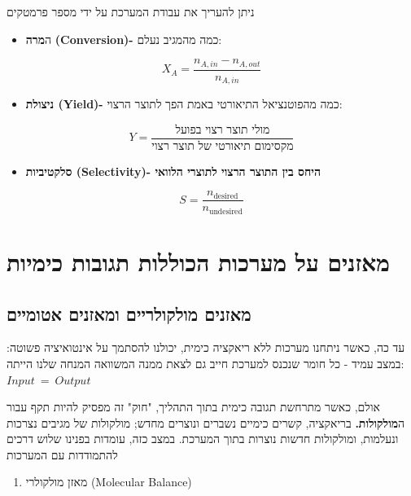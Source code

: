 \documentclass[
  hebrew,
  letterpaper,
  DIV=11,
  numbers=noendperiod]{scrreprt}
\providecommand{\tightlist}{%
  \setlength{\itemsep}{0pt}\setlength{\parskip}{0pt}}
\begin{document}
ניתן להעריך את עבודת המערכת על ידי מספר פרמטקים

\begin{itemize}
\tightlist
\item
  ה\textbf{מרה} \textbf{(Conversion)-} כמה מהמגיב נעלם:
\end{itemize}

\[X_{A} = \frac{n_{A,in} - n_{A,out}}{n_{A,in}}\]

\begin{itemize}
\tightlist
\item
  \textbf{ניצולת (Yield)-} כמה מהפוטנציאל התיאורטי באמת הפך לתוצר הרצוי:
\end{itemize}

\[Y = \frac{\text{מולי תוצר רצוי בפועל}}{\text{מקסימום תיאורטי של תוצר רצוי}}\]

\begin{itemize}
\tightlist
\item
  \textbf{סלקטיביות (Selectivity)- היחס בין התוצר הרצוי לתוצרי הלוואי}
\end{itemize}

\[S = \frac{n_{\text{desired}}}{n_{\text{undesired}}}\]

\section{מאזנים על מערכות הכוללות תגובות
כימיות}\label{ux5deux5d0ux5d6ux5e0ux5d9ux5dd-ux5e2ux5dc-ux5deux5e2ux5e8ux5dbux5d5ux5ea-ux5d4ux5dbux5d5ux5dcux5dcux5d5ux5ea-ux5eaux5d2ux5d5ux5d1ux5d5ux5ea-ux5dbux5d9ux5deux5d9ux5d5ux5ea}

\subsection{מאזנים מולקולריים ומאזנים
אטומיים}\label{ux5deux5d0ux5d6ux5e0ux5d9ux5dd-ux5deux5d5ux5dcux5e7ux5d5ux5dcux5e8ux5d9ux5d9ux5dd-ux5d5ux5deux5d0ux5d6ux5e0ux5d9ux5dd-ux5d0ux5d8ux5d5ux5deux5d9ux5d9ux5dd}

עד כה, כאשר ניתחנו מערכות ללא ריאקציה כימית, יכולנו להסתמך על אינטואיציה
פשוטה: במצב עמיד - כל חומר שנכנס למערכת חייב גם לצאת ממנה המשוואה המנחה
שלנו הייתה: \(Input\  = \ Output\)

אולם, כאשר מתרחשת תגובה כימית בתוך התהליך, "חוק" זה מפסיק להיות תקף עבור
ה\textbf{מולקולות.} בריאקציה, קשרים כימיים נשברים ונוצרים מחדש; מולקולות
של מגיבים נצרכות ונעלמות, ומולקולות חדשות נוצרות בתוך המערכת. במצב כזה,
עומדות בפנינו שלוש דרכים להתמודדות עם המערכות

\begin{enumerate}
\def\labelenumi{\arabic{enumi}.}
\tightlist
\item
  מאזן מולקולרי (Molecular Balance)
\end{enumerate}
\end{document}
